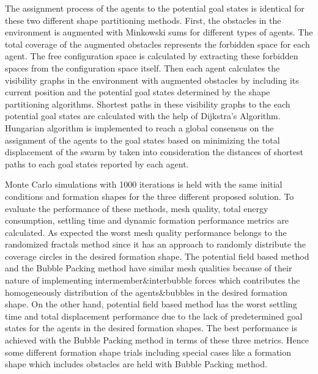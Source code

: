 The assignment process of the agents to the potential goal states is identical for these two different shape partitioning methods. First, the obstacles in the environment is augmented with Minkowski sums for different types of agents. The total coverage of the augmented obstacles represents the forbidden space for each agent. The free configuration space is calculated by extracting these forbidden spaces from the configuration space itself. Then each agent calculates the visibility graphs in the environment with augmented obstacles by including its current position and the potential goal states determined by the shape partitioning algorithms. Shortest paths in these visibility graphs to the each potential goal states are calculated with the help of Dijkstra's Algorithm. Hungarian algorithm is implemented to reach a global consensus on the assignment of the agents to the goal states based on minimizing the total displacement of the swarm by taken into consideration the distances of shortest paths to each goal states reported by each agent. 
       
Monte Carlo simulations with 1000 iterations is held with the same initial conditions and formation shapes for the three different proposed solution. To evaluate the performance of these methods, mesh quality, total energy consumption, settling time and dynamic formation performance metrics are calculated. As expected the worst mesh quality performance belongs to the randomized fractals method since it has an approach to randomly distribute the coverage circles in the desired formation shape. The potential field based method and the Bubble Packing method have similar mesh qualities because of their nature of implementing intermember$\&$interbubble forces which contributes the homogeneously distribution of the agents$\&$bubbles in the desired formation shape. On the other hand, potential field based method has the worst settling time and total displacement performance due to the lack of predetermined goal states for the agents in the desired formation shapes. The best performance is achieved with the Bubble Packing method in terms of these three metrics. Hence some different formation shape trials including special cases like a formation shape which includes obstacles are held with Bubble Packing method. 
       
